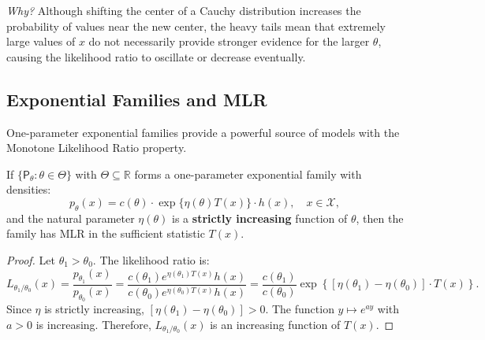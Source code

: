\textit{Why?} Although shifting the center of a Cauchy distribution increases the probability of values near the new center, the heavy tails mean that extremely large values of $x$ do not necessarily provide stronger evidence for the larger $\theta$, causing the likelihood ratio to oscillate or decrease eventually.

\subsection{Exponential Families and MLR}
\label{sec:exponential_families_mlr}

One-parameter exponential families provide a powerful source of models with the Monotone Likelihood Ratio property.

\begin{pro}
\label{prop:exp_family_mlr}
If $\{\mathsf{P}_{\theta} : \theta \in \Theta\}$ with $\Theta \subseteq \mathbb{R}$ forms a one-parameter exponential family with densities:
\[
p_{\theta}(x) = c(\theta) \cdot \exp\{\eta(\theta) T(x)\} \cdot h(x), \quad x \in \mathcal{X},
\]
and the natural parameter $\eta(\theta)$ is a \textbf{strictly increasing} function of $\theta$, then the family has MLR in the sufficient statistic $T(x)$.
\end{pro}

\begin{proof}
Let $\theta_1 > \theta_0$. The likelihood ratio is:
\[
L_{\theta_1/\theta_0}(x) = \frac{p_{\theta_1}(x)}{p_{\theta_0}(x)} 
= \frac{c(\theta_1) e^{\eta(\theta_1) T(x)} h(x)}{c(\theta_0) e^{\eta(\theta_0) T(x)} h(x)}
= \frac{c(\theta_1)}{c(\theta_0)} \exp\left\{ [\eta(\theta_1) - \eta(\theta_0)] \cdot T(x) \right\}.
\]
Since $\eta$ is strictly increasing, $[\eta(\theta_1) - \eta(\theta_0)] > 0$. 
The function $y \mapsto e^{ay}$ with $a>0$ is increasing. Therefore, $L_{\theta_1/\theta_0}(x)$ is an increasing function of $T(x)$.
\end{proof}

